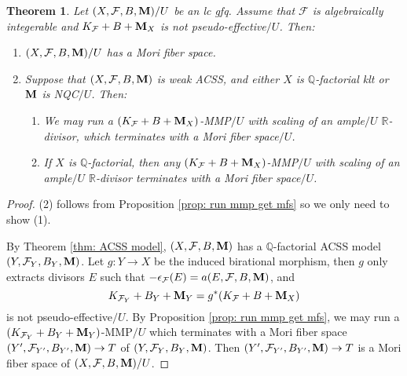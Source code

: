 \documentclass[11pt]{amsart}
\numberwithin{equation}{section}
\newcommand{\Mm}{{\bf{M}}}
\newcommand{\Qq}{\mathbb{Q}}
\newcommand{\Rr}{\mathbb{R}}
\newcommand{\Ff}{\mathcal{F}}
\newtheorem{thm}{Theorem}[subsection]
\theoremstyle{definition}
\theoremstyle{definition}
\theoremstyle{definition}
\begin{document}
\begin{thm}\label{thm: existence mfs}
Let $(X,\Ff,B,\Mm)/U$ be an lc gfq. Assume that $\Ff$ is algebraically integerable and $K_{\Ff}+B+\Mm_X$ is not pseudo-effective$/U$. Then:
\begin{enumerate}
  \item $(X,\Ff,B,\Mm)/U$ has a Mori fiber space.
  \item Suppose that $(X,\Ff,B,\Mm)$ is weak ACSS, and either $X$ is $\Qq$-factorial klt or $\Mm$ is NQC$/U$. Then:
  \begin{enumerate}
    \item We may run a $(K_{\Ff}+B+\Mm_X)$-MMP$/U$ with scaling of an ample$/U$ $\Rr$-divisor, which terminates with a Mori fiber space$/U$.
    \item If $X$ is $\Qq$-factorial, then any $(K_{\Ff}+B+\Mm_X)$-MMP$/U$ with scaling of an ample$/U$ $\Rr$-divisor terminates with a Mori fiber space$/U$.
   \end{enumerate}
   \end{enumerate}
\end{thm}
\begin{proof}
(2) follows from Proposition \ref{prop: run mmp get mfs} so we only need to show (1). 

By Theorem \ref{thm:  ACSS model}, $(X,\Ff,B,\Mm)$ has a $\Qq$-factorial ACSS model $(Y,\Ff_Y,B_Y,\Mm)$. Let $g: Y\rightarrow X$ be the induced birational morphism, then $g$ only extracts divisors $E$ such that $-\epsilon_{\Ff}(E)=a(E,\Ff,B,\Mm)$, and
$$K_{\Ff_Y}+B_Y+\Mm_Y=g^*(K_{\Ff}+B+\Mm_X)$$
is not pseudo-effective$/U$. By Proposition \ref{prop: run mmp get mfs}, we may run a $(K_{\Ff_Y}+B_Y+\Mm_Y)$-MMP$/U$ which terminates with a Mori fiber space $(Y',\Ff_{Y'},B_{Y'},\Mm)\rightarrow T$ of $(Y,\Ff_Y,B_Y,\Mm)$. Then $(Y',\Ff_{Y'},B_{Y'},\Mm)\rightarrow T$ is a Mori fiber space of $(X,\Ff,B,\Mm)/U$.
\end{proof}
\end{document}
